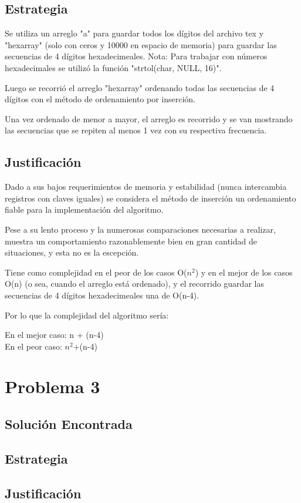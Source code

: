 \documentclass[12pt]{article}
\begin{document}
\subsection{Estrategia}

Se utiliza un arreglo "a" para guardar todos los dígitos del archivo tex y "hexarray" (solo con ceros y 10000 en espacio de memoria) para guardar las secuencias de 4 dígitos hexadecimeales.
Nota: Para trabajar con números hexadecimales se utilizó la función "strtol(char, NULL, 16)". 

Luego se recorrió el arreglo "hexarray" ordenando todas las secuencias de 4 dígitos con el método de ordenamiento por inserción.

Una vez ordenado de menor a mayor, el arreglo es recorrido y se van mostrando las secuencias que se repiten al menos 1 vez con su respectiva frecuencia.

\subsection{Justificación}

Dado a sus bajos requerimientos de memoria y estabilidad (nunca intercambia registros con claves iguales) se considera el método de inserción un ordenamiento fiable para la implementación del algoritmo.

Pese a su lento proceso y la numerosas comparaciones necesarias a realizar, muestra un comportamiento razonablemente bien en gran cantidad de situaciones, y esta no es la escepción.

Tiene como complejidad en el peor de los casos O($n^2$) y en el mejor de los casos O(n) (o sea, cuando el arreglo está ordenado), y el recorrido guardar las secuencias de 4 dígitos hexadecimeales una de O(n-4).

Por lo que la complejidad del algoritmo sería: 

En el mejor caso: n + (n-4)
\\
En el peor caso: $n^2$+(n-4)



\section{Problema 3}

\subsection{Solución Encontrada}

\subsection{Estrategia}

\subsection{Justificación}
\end{document}
